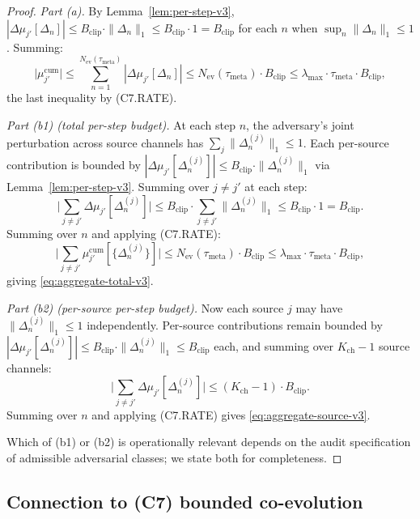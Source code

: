 \documentclass{article}
\newcommand{\Bclip}{B_{\mathrm{clip}}}
\newcommand{\Kch}{K_{\mathrm{ch}}}
\newcommand{\Nev}{N_{\mathrm{ev}}}
\newcommand{\lammax}{\lambda_{\max}}
\newcommand{\taumeta}{\tau_{\mathrm{meta}}}
\begin{document}
\begin{proof}
\emph{Part (a).}  By Lemma~\ref{lem:per-step-v3}, $|\Delta\mu_{j'}[
\Delta_n]| \leq \Bclip \cdot \|\Delta_n\|_1 \leq \Bclip \cdot 1 =
\Bclip$ for each $n$ when $\sup_n \|\Delta_n\|_1 \leq 1$.  Summing:
\[
  \big| \mu_{j'}^{\mathrm{cum}} \big| \leq \sum_{n=1}^{\Nev(\taumeta)}
  |\Delta\mu_{j'}[\Delta_n]| \leq \Nev(\taumeta) \cdot \Bclip
  \leq \lammax \cdot \taumeta \cdot \Bclip,
\]
the last inequality by (C7.RATE).

\emph{Part (b1) (total per-step budget).}  At each step $n$, the
adversary's joint perturbation across source channels has $\sum_j
\|\Delta_n^{(j)}\|_1 \leq 1$.  Each per-source contribution is
bounded by $|\Delta\mu_{j'}[\Delta_n^{(j)}]| \leq \Bclip \cdot
\|\Delta_n^{(j)}\|_1$ via Lemma~\ref{lem:per-step-v3}.  Summing
over $j \neq j'$ at each step:
\[
  \big| \sum_{j \neq j'} \Delta\mu_{j'}[\Delta_n^{(j)}] \big|
  \leq \Bclip \cdot \sum_{j \neq j'} \|\Delta_n^{(j)}\|_1
  \leq \Bclip \cdot 1 = \Bclip.
\]
Summing over $n$ and applying (C7.RATE):
\[
  \big| \sum_{j \neq j'} \mu_{j'}^{\mathrm{cum}}[\{\Delta_n^{(j)}\}] \big|
  \leq \Nev(\taumeta) \cdot \Bclip \leq \lammax \cdot \taumeta \cdot
  \Bclip,
\]
giving \eqref{eq:aggregate-total-v3}.

\emph{Part (b2) (per-source per-step budget).}  Now each source
$j$ may have $\|\Delta_n^{(j)}\|_1 \leq 1$ independently.  Per-source
contributions remain bounded by
$|\Delta\mu_{j'}[\Delta_n^{(j)}]| \leq \Bclip \cdot
\|\Delta_n^{(j)}\|_1 \leq \Bclip$ each, and summing over $\Kch -
1$ source channels:
\[
  \big| \sum_{j \neq j'} \Delta\mu_{j'}[\Delta_n^{(j)}] \big|
  \leq (\Kch - 1) \cdot \Bclip.
\]
Summing over $n$ and applying (C7.RATE) gives
\eqref{eq:aggregate-source-v3}.

Which of (b1) or (b2) is operationally relevant depends on the
audit specification of admissible adversarial classes; we state
both for completeness.
\end{proof}

\subsection{Connection to (C7) bounded co-evolution}
\end{document}
